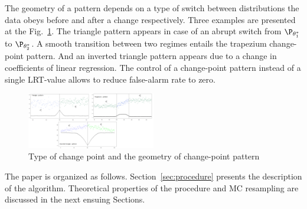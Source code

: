 The geometry of a pattern depends on a type of switch between distributions the data obeys before and after a change respectively. Three examples are presented at the Fig.~\ref{fig:patterns}. The triangle pattern appears in case of an abrupt switch from $\P_{\theta_1^*}$ to $\P_{\theta_2^*}$. A smooth transition between two regimes entails the trapezium change-point pattern. And an inverted triangle pattern appears due to a change in coefficients of linear regression. The control of a change-point pattern instead of a single LRT-value allows to reduce false-alarm rate to zero.

\begin{figure}[!h]
    \centering
    \includegraphics[width=0.5\textwidth, height=0.25\textwidth]{images/patterns-3.png}
    \caption{Type of change point and the geometry of change-point pattern}
    \label{fig:patterns}
\end{figure}


The paper is organized as follows. Section~\ref{sec:procedure} presents the description of the algorithm. Theoretical properties of the procedure and MC resampling are discussed in the next ensuing Sections.  
